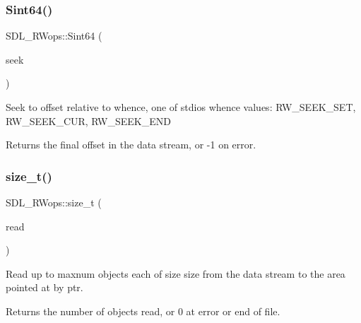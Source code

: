 \subsubsection{\texorpdfstring{Sint64()}{Sint64()}\hspace{0.1cm}{\footnotesize\ttfamily [2/2]}}
{\footnotesize\ttfamily S\+D\+L\+\_\+\+R\+Wops\+::\+Sint64 (\begin{DoxyParamCaption}\item[{\hyperlink{begin__code_8h_a81faf4ba0455dc75f2e0507eddb79401}{S\+D\+L\+C\+A\+LL} $\ast$}]{seek }\end{DoxyParamCaption})}

Seek to {\ttfamily offset} relative to {\ttfamily whence}, one of stdio\textquotesingle{}s whence values\+: R\+W\+\_\+\+S\+E\+E\+K\+\_\+\+S\+ET, R\+W\+\_\+\+S\+E\+E\+K\+\_\+\+C\+UR, R\+W\+\_\+\+S\+E\+E\+K\+\_\+\+E\+ND

\begin{DoxyReturn}{Returns}
the final offset in the data stream, or -\/1 on error. 
\end{DoxyReturn}
\mbox{\label{struct_s_d_l___r_wops_acd9a3c6e840d285c1e30cadaf99097b2}} 
\subsubsection{\texorpdfstring{size\+\_\+t()}{size\_t()}\hspace{0.1cm}{\footnotesize\ttfamily [1/2]}}
{\footnotesize\ttfamily S\+D\+L\+\_\+\+R\+Wops\+::size\+\_\+t (\begin{DoxyParamCaption}\item[{\hyperlink{begin__code_8h_a81faf4ba0455dc75f2e0507eddb79401}{S\+D\+L\+C\+A\+LL} $\ast$}]{read }\end{DoxyParamCaption})}

Read up to {\ttfamily maxnum} objects each of size {\ttfamily size} from the data stream to the area pointed at by {\ttfamily ptr}.

\begin{DoxyReturn}{Returns}
the number of objects read, or 0 at error or end of file. 
\end{DoxyReturn}
\mbox{\label{struct_s_d_l___r_wops_a5f12fd517afffba5bfaff4643d6792b1}} 

